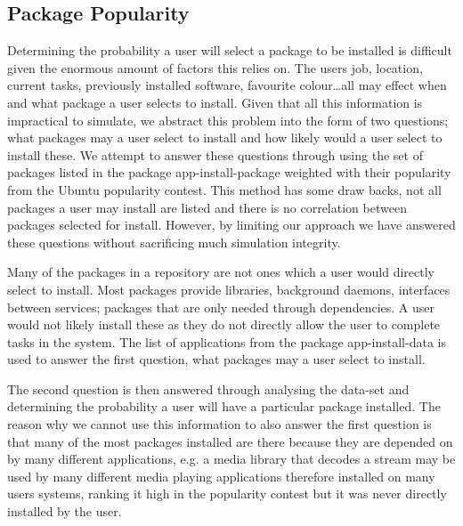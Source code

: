 \subsection{Package Popularity}
{}Determining the probability a user will select a package to be installed is difficult given the enormous amount of factors this relies on.
{}The users job, location, current tasks, previously installed software, favourite colour\ldots all may effect when and what package a user selects to install.
{}Given that all this information is impractical to simulate, we abstract this problem into the form of two questions;
{}what packages may a user select to install and how likely would a user select to install these.
{}We attempt to answer these questions through using the set of packages listed in the package app-install-package
{}weighted with their popularity from the Ubuntu popularity contest.
{}This method has some draw backs, not all packages a user may install are listed and there is no correlation between packages selected for install.
{}However, by limiting our approach we have answered these questions without sacrificing much simulation integrity.

Many of the packages in a repository are not ones which a user would directly select to install.
Most packages provide libraries, background daemons, interfaces between services; packages that are only needed through dependencies.
A user would not likely install these as they do not directly allow the user to complete tasks in the system.
The list of applications from the package app-install-data is used to answer the first question, what packages may a user select to install.

The second question is then answered through analysing the data-set and determining the probability a user will have a particular package installed.
The reason why we cannot use this information to also answer the first question is that many of the most packages installed are there because they are depended on by many different applications,
e.g. a media library that decodes a stream may be used by many different media playing applications therefore installed on many users systems, 
ranking it high in the popularity contest but it was never directly installed by the user.


